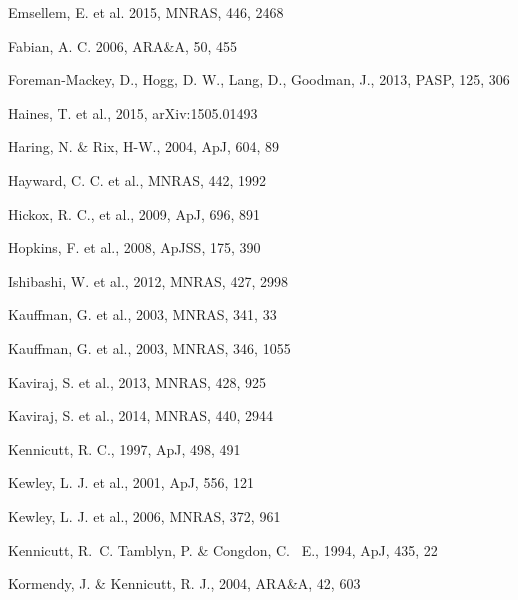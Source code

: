 \documentclass[useAMS,usenatbib]{mn2e}
\begin{document}
\begin{thebibliography}{}
 Emsellem, E. et al. 2015, MNRAS, 446, 2468

 Fabian, A. C. 2006, ARA\&A, 50, 455

 Foreman-Mackey, D., Hogg, D. W., Lang, D., Goodman, J., 2013, PASP, 125, 306

 Haines, T. et al., 2015, arXiv:1505.01493

 Haring, N. \& Rix, H-W., 2004, ApJ, 604, 89

 Hayward, C. C. et al., MNRAS, 442, 1992

 Hickox, R. C., et al., 2009, ApJ, 696, 891

 Hopkins, F. et al., 2008, ApJSS, 175, 390

 Ishibashi, W. et al., 2012, MNRAS, 427, 2998

 Kauffman, G. et al., 2003, MNRAS, 341, 33

 Kauffman, G. et al., 2003, MNRAS, 346, 1055


 Kaviraj, S. et al., 2013, MNRAS, 428, 925

 Kaviraj, S. et al., 2014, MNRAS, 440, 2944

 Kennicutt, R. C., 1997, ApJ, 498, 491

 Kewley, L. J. et al., 2001, ApJ, 556, 121

 Kewley, L. J. et al., 2006, MNRAS, 372, 961

 Kennicutt, R.~C. Tamblyn, P. \& Congdon, C. ~E., 1994, ApJ, 435, 22

 Kormendy, J. \& Kennicutt, R. J., 2004, ARA\&A, 42, 603


\end{thebibliography}
\end{document}
